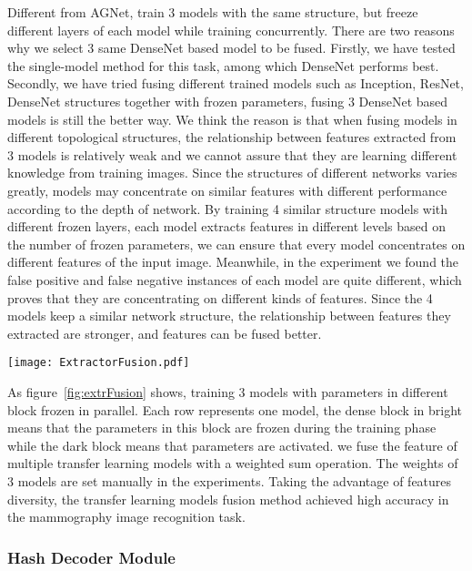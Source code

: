 Different from AGNet, train 3 models with 
the same structure, but freeze different 
layers of each model while training 
concurrently. There are two reasons why we 
select 3 same DenseNet based model to be fused. 
Firstly, we have tested the single-model 
method for this task, among which DenseNet
performs best. Secondly, we have tried fusing 
different trained models such as Inception, 
ResNet, DenseNet structures together with frozen 
parameters, fusing 3 DenseNet based models 
is still the better way. We think the reason 
is that when fusing models in different 
topological structures, the relationship 
between features extracted from 3 models is 
relatively weak and we cannot assure that 
they are learning different knowledge from 
training images. Since the structures of 
different networks varies greatly, models may
concentrate on similar features with different 
performance according to the depth of network. 
By training 4 similar structure models with 
different frozen layers, each model extracts 
features in different levels based on the 
number of frozen parameters, we can ensure 
that every model concentrates on different 
features of the input image. Meanwhile, in
the experiment we found the false positive 
and false negative instances of each model 
are quite different, which proves that they 
are concentrating on different kinds of 
features. Since the 4 models keep a similar 
network structure, the relationship between 
features they extracted are stronger,
and features can be fused better.

\begin{figure*}[!ht]
    \centering
    \texttt{[image: ExtractorFusion.pdf]}
    \caption{The module of feature extractors' 
        fusion.}
    \label{fig:extrFusion}
\end{figure*} 

As figure~\ref{fig:extrFusion}
shows, training 3 models with parameters in 
different block frozen in parallel. Each row 
represents one model, the dense block in 
bright means that the parameters in this 
block are frozen during the training phase 
while the dark block means that parameters 
are activated. we fuse the feature of multiple 
transfer learning models with a weighted
sum operation. The weights of 3 models are 
set manually in the experiments. Taking the 
advantage of features diversity, the transfer 
learning models fusion method achieved high
accuracy in the mammography image recognition
task. 


\subsubsection{Hash Decoder Module}
\label{sec:MethNetHash}

